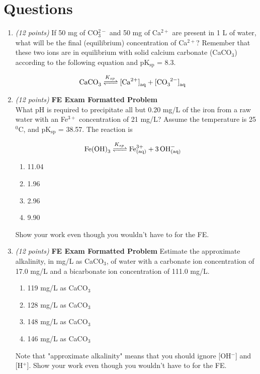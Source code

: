 \documentclass[12pt,letterpaper]{article}
\begin{document}
\section *{Questions}
\begin{enumerate}
\item \emph{(12 points)} If 50 mg of CO$_3^{2-}$ and 50 mg of Ca$^{2+}$ are present in 1 L of water, what will be the final (equilibrium) concentration of Ca$^{2+}$?  Remember that these two ions are in equilibrium with solid calcium carbonate (CaCO$_3$) according to the following equation and $\mathrm{pK_{sp}}$ = 8.3. 

\begin{align*}
\cee{CaCO_3  &<=>[K_{sp}] [Ca^{2+}]_{aq} + [CO_3^{2-}]_{aq}}
\end{align*}

\item \emph{(12 points)} \textbf{FE Exam Formatted Problem}\\
What pH is required to precipitate all but 0.20 mg/L of the iron from a raw water with an Fe$^{3+}$ concentration of 21 mg/L?  Assume the temperature is 25 $^0$C, and pK$\mathrm{_{sp}}$ = 38.57.  The reaction is

\begin{align*}
\cee{Fe(OH)_3  &<=>[K_{sp}] Fe^{3+}_{(aq)} + 3OH^-_{(aq)}}
\end{align*}

\begin{enumerate}
\item 11.04
\item 1.96
\item 2.96
\item 9.90
\end{enumerate}

Show your work even though you wouldn't have to for the FE.


\item \emph{(12 points)} \textbf{FE Exam Formatted Problem} Estimate the approximate alkalinity, in mg/L as CaCO$_3$, of water with a carbonate ion concentration of 17.0 mg/L and a bicarbonate ion concentration of 111.0 mg/L. 

\begin{enumerate}
\item 119 mg/L as CaCO$_3$
\item 128 mg/L as CaCO$_3$
\item 148 mg/L as CaCO$_3$
\item 146 mg/L as CaCO$_3$
\end{enumerate}
Note that "approximate alkalinity" means that you should ignore [OH$^-$] and [H$^+$].
Show your work even though you wouldn't have to for the FE.


\end{enumerate}
\end{document}
